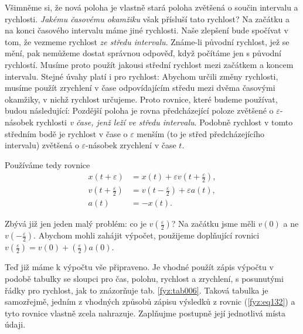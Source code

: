     Všimněme si, že nová poloha je vlastně stará poloha zvětšená o součin intervalu a rychlosti. 
    \emph{Jakému časovému okamžiku} však přísluší tato rychlost? Na začátku a na konci časového 
    intervalu máme jiné rychlosti. Naše zlepšení bude spočívat v tom, že vezmeme rychlost \emph{ze 
    středu intervalu}. Známe-li původní rychlost, jež se mění, pak nemůžeme dostat správnou 
    odpověď, když počítáme jen s původní rychlostí. Musíme proto použít jakousi střední rychlost 
    mezi začátkem a koncem intervalu. Stejné úvahy platí i pro rychlost: Abychom určili změny 
    rychlosti, musíme použít zrychlení v čase odpovídajícím středu mezi dvěma časovými okamžiky, v 
    nichž rychlost určujeme. Proto rovnice, které budeme používat, budou následující: Pozdější 
    poloha je rovna předcházející poloze zvětšené o \(\varepsilon\)-násobek rychlosti \emph{v čase, 
    jenž leží ve středu intervalu}. Podobně rychlost v tomto středním bodě je rychlost v čase o 
    \(\varepsilon\) menším (to je střed předcházejícího intervalu) zvětšená o 
    \(\varepsilon\)-násobek zrychlení v čase \(t\).
    
    Používáme tedy rovnice
    \begin{subequations}
      \label{fyz:eq132} 
      \begin{align}
      x(t+\varepsilon) 
           &= x(t) + \varepsilon v\left(t+\frac{\varepsilon}{2}\right), \label{fyz:eq132a} \\
      v(t+\frac{\varepsilon}{2}) 
           &= v\left(t-\frac{\varepsilon}{2}\right) + \varepsilon a(t), \label{fyz:eq132b} \\
      a(t) &= -x(t).                                                    \label{fyz:eq132c}
      \end{align}
    \end{subequations}
    
    Zbývá již jen jeden malý problém: co je \(v(\frac{\varepsilon}{2})\)? Na začátku jsme měli 
    \(v(0)\) a ne \(v(-\frac{\varepsilon}{2})\). Abychom mohli zahájit výpočet, použijeme 
    doplňující rovnici \(v(\frac{\varepsilon}{2}) = v(0) + (\frac{\varepsilon}{2})a(0)\).
    
    Teď již máme k výpočtu vše připraveno. Je vhodné použít zápis výpočtu v podobě tabulky se 
    sloupci pro čas, polohu, rychlost a zrychlení, s posunutými řádky pro rychlost, jak to 
    znázorňuje tab. \ref{fyz:tab006}. Taková tabulka je samozřejmě, jedním z vhodných způsobů 
    zápisu výsledků z  rovnic (\ref{fyz:eq132}) a tyto rovnice vlastně zcela nahrazuje. Zaplňujme 
    postupně její jednotlivá místa údaji.
    

